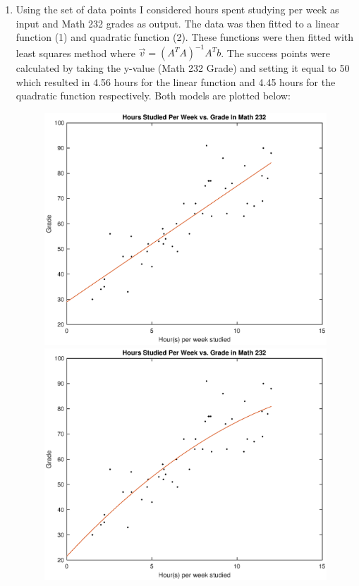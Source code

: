 \documentclass[10pt]{article}
\begin{document}
\noindent{}
\normalsize
\begin{enumerate}[leftmargin=\labelsep]
    
    \item Using the set of data points I considered hours spent studying per week as input and Math 232 grades as output. The data was then fitted
    to a linear function (1) and quadratic function (2). These functions were then fitted with least squares method where $\vec{v} = {(A^{T}A)}^{-1}A^{T}b$.
    The success points were calculated by taking the y-value (Math 232 Grade) and setting it equal to 50 which resulted in 4.56 hours for the linear function
    and 4.45 hours for the quadratic function respectively. Both models are plotted below:

    \begin{figure}[h]
        \begin{minipage}[c]{0.48\linewidth}
        \includegraphics[width=\linewidth]{Linear.eps}
        \end{minipage}
        \hfill
        \begin{minipage}[c]{0.48\linewidth}
        \includegraphics[width=\linewidth]{Quadratic.eps}

\end{minipage}
\end{figure}
\end{enumerate}
\end{document}
